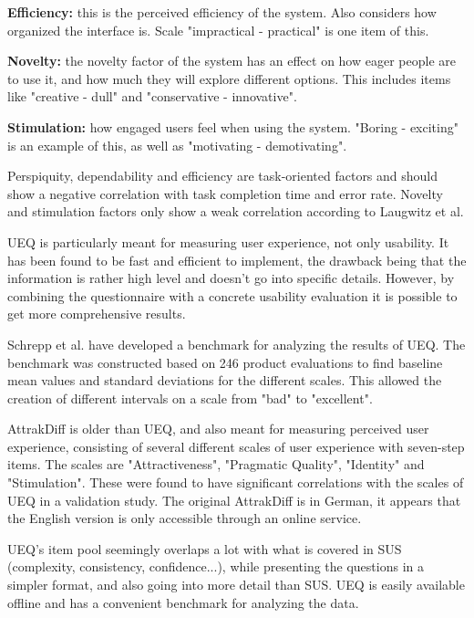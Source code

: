 \textbf{Efficiency:} this is the perceived efficiency of the system. Also considers how organized the interface is. Scale "impractical - practical" is one item of this.

\textbf{Novelty:} the novelty factor of the system has an effect on how eager people are to use it, and how much they will explore different options. This includes items like "creative - dull" and "conservative - innovative".

\textbf{Stimulation:} how engaged users feel when using the system. "Boring - exciting" is an example of this, as well as "motivating - demotivating".

Perspiquity, dependability and efficiency are task-oriented factors and should show a negative correlation with task completion time and error rate. Novelty and stimulation factors only show a weak correlation according to Laugwitz et al. \cite{laugwitz2008construction}

UEQ is particularly meant for measuring user experience, not only usability. It has been found to be fast and efficient to implement, the drawback being that the information is rather high level and doesn't go into specific details. However, by combining the questionnaire with a concrete usability evaluation it is possible to get more comprehensive results. \cite{schrepp2014applying, rauschenberger2013efficient}

Schrepp et al. \cite{schrepp2017construction} have developed a benchmark for analyzing the results of UEQ. The benchmark was constructed based on 246 product evaluations to find baseline mean values and standard deviations for the different scales. This allowed the creation of different intervals on a scale from "bad" to "excellent".

AttrakDiff is older than UEQ, and also meant for measuring perceived user experience, consisting of several different scales of user experience with seven-step items. The scales are "Attractiveness", "Pragmatic Quality", "Identity" and "Stimulation". These were found to have significant correlations with the scales of UEQ in a validation study. \cite{laugwitz2008construction} The original AttrakDiff is in German, it appears that the English version is only accessible through an online service. \cite{attrakdiff}

UEQ's item pool seemingly overlaps a lot with what is covered in SUS (complexity, consistency, confidence...), while presenting the questions in a simpler format, and also going into more detail than SUS. UEQ is easily available offline and has a convenient benchmark for analyzing the data.


